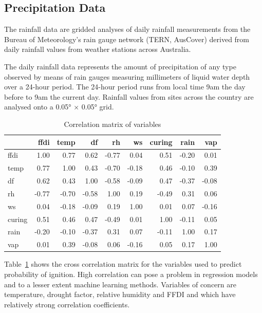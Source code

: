 \documentclass[11pt,a4paper]{article}
\begin{document}
\subsection{Precipitation Data}

The rainfall data are gridded analyses of daily rainfall measurements from the Bureau of Meteorology's rain gauge network (TERN, AusCover) derived from daily rainfall values from weather stations across Australia.

The daily rainfall data represents the amount of precipitation of any type observed by means of rain gauges measuring millimeters of liquid water depth over a 24-hour period. The 24-hour period runs from local time 9am the day before to 9am the current day. Rainfall values from sites across the country are analysed onto a 0.05° × 0.05° grid.

\begin{table}
  \centering
  \begin{tabular}{lrrrrrrrr}
    \toprule
           & ffdi  & temp  & df    & rh    & ws    & curing & rain  & vap \\
    \midrule
    ffdi   & 1.00  & 0.77  & 0.62  & -0.77 & 0.04  & 0.51   & -0.20 & 0.01 \\
    temp   & 0.77  & 1.00  & 0.43  & -0.70 & -0.18 & 0.46   & -0.10 & 0.39 \\
    df     & 0.62  & 0.43  & 1.00  & -0.58 & -0.09 & 0.47   & -0.37 & -0.08 \\
    rh     & -0.77 & -0.70 & -0.58 & 1.00  & 0.19  & -0.49  & 0.31  & 0.06 \\
    ws     & 0.04  & -0.18 & -0.09 & 0.19  & 1.00  & 0.01   & 0.07  & -0.16 \\
    curing & 0.51  & 0.46  & 0.47  & -0.49 & 0.01  & 1.00   & -0.11 & 0.05 \\
    rain   & -0.20 & -0.10 & -0.37 & 0.31  & 0.07  & -0.11  & 1.00  & 0.17 \\
    vap    & 0.01  & 0.39  & -0.08 & 0.06  & -0.16 & 0.05   & 0.17  & 1.00 \\
    \bottomrule
  \end{tabular}
  \caption{Correlation matrix of variables}
  \label{table:correl}
\end{table}

Table~\ref{table:correl} shows the cross correlation matrix for the variables used to predict probability of ignition. High correlation can pose a problem in regression models and to a lesser extent machine learning methods. Variables of concern are temperature, drought factor, relative humidity and FFDI and  which have relatively strong correlation coefficients.
\end{document}
